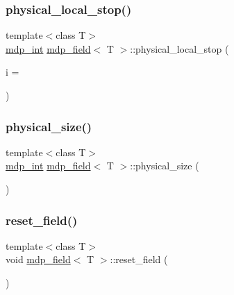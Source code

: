 \mbox{\label{classmdp__field_afc3c5a4aa6512d4b99f08ae58d7e50a7}} 
\subsubsection{\texorpdfstring{physical\+\_\+local\+\_\+stop()}{physical\_local\_stop()}}
{\footnotesize\ttfamily template$<$class T$>$ \\
\hyperlink{mdp__global__vars_8h_aaa1ad9d0dcd2124aa5af0120d9954174}{mdp\+\_\+int} \hyperlink{classmdp__field}{mdp\+\_\+field}$<$ T $>$\+::physical\+\_\+local\+\_\+stop (\begin{DoxyParamCaption}\item[{int}]{i = {} }\end{DoxyParamCaption})\hspace{0.3cm}{\ttfamily [inline]}}

\mbox{\label{classmdp__field_a0f6da321ba9bdae3a571dbbe5087d799}} 
\subsubsection{\texorpdfstring{physical\+\_\+size()}{physical\_size()}}
{\footnotesize\ttfamily template$<$class T$>$ \\
\hyperlink{mdp__global__vars_8h_aaa1ad9d0dcd2124aa5af0120d9954174}{mdp\+\_\+int} \hyperlink{classmdp__field}{mdp\+\_\+field}$<$ T $>$\+::physical\+\_\+size (\begin{DoxyParamCaption}{ }\end{DoxyParamCaption})\hspace{0.3cm}{\ttfamily [inline]}}

\mbox{\label{classmdp__field_aa581ac8278d31ed9dabbff2df49c7130}} 
\subsubsection{\texorpdfstring{reset\+\_\+field()}{reset\_field()}}
{\footnotesize\ttfamily template$<$class T$>$ \\
void \hyperlink{classmdp__field}{mdp\+\_\+field}$<$ T $>$\+::reset\+\_\+field (\begin{DoxyParamCaption}{ }\end{DoxyParamCaption})\hspace{0.3cm}{\ttfamily [inline]}}



